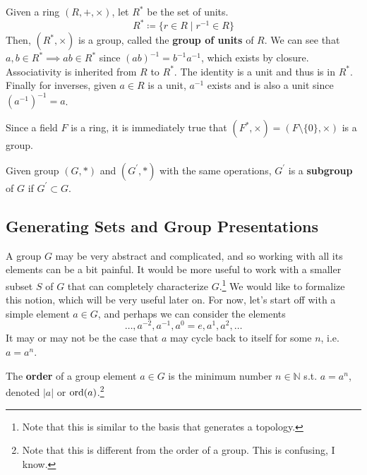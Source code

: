   \begin{example}
    Given a ring $(R, +, \times)$, let $R^\ast$ be the set of units. 
    \begin{equation}
      R^\ast \coloneqq \{r \in R \mid r^{-1} \in R\}
    \end{equation}
    Then, $(R^\ast, \times)$ is a group, called the \textbf{group of units} of $R$. We can see that $a, b \in R^\ast \implies ab \in R^\ast$ since $(ab)^{-1} = b^{-1} a^{-1}$, which exists by closure. Associativity is inherited from $R$ to $R^\ast$. The identity is a unit and thus is in $R^\ast$. Finally for inverses, given $a \in R$ is a unit, $a^{-1}$ exists and is also a unit since $(a^{-1})^{-1} = a$. 
  \end{example} 

  Since a field $F$ is a ring, it is immediately true that $(F^\ast, \times) = (F \setminus \{0\}, \times)$ is a group. 

  \begin{definition}[Subgroup]
    Given group $(G, \ast)$ and $(G^\prime, \ast)$ with the same operations, $G^\prime$ is a \textbf{subgroup} of $G$ if $G^\prime \subset G$. 
  \end{definition} 

\subsection{Generating Sets and Group Presentations} 

  A group $G$ may be very abstract and complicated, and so working with all its elements can be a bit painful. It would be more useful to work with a smaller subset $S$ of $G$ that can completely characterize $G$.\footnote{Note that this is similar to the basis that generates a topology.} We would like to formalize this notion, which will be very useful later on. For now, let's start off with a simple element $a \in G$, and perhaps we can consider the elements 
  \begin{equation}
    \ldots, a^{-2}, a^{-1}, a^0 = e, a^1, a^2, \ldots
  \end{equation}
  It may or may not be the case that $a$ may cycle back to itself for some $n$, i.e. $a = a^n$. 

  \begin{definition}
    The \textbf{order} of a group element $a \in G$ is the minimum number $n \in \mathbb{N}$ s.t. $a = a^n$, denoted $|a|$ or $\operatorname{ord}(a)$.\footnote{Note that this is different from the order of a group. This is confusing, I know. }
  \end{definition} 

